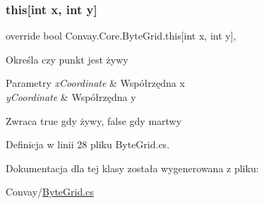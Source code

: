 \subsubsection{\texorpdfstring{this[int x, int y]}{this[int x, int y]}}
{\footnotesize\ttfamily override bool Convay.\+Core.\+Byte\+Grid.\+this\mbox{[}int x, int y\mbox{]}\hspace{0.3cm}{\ttfamily [get]}, {\ttfamily [set]}}



Określa czy punkt jest żywy 


\begin{DoxyParams}{Parametry}
{\em x\+Coordinate} & Współrzędna x\\
\hline
{\em y\+Coordinate} & Współrzędna y\\
\hline
\end{DoxyParams}
\begin{DoxyReturn}{Zwraca}
true gdy żywy, false gdy martwy
\end{DoxyReturn}


Definicja w linii 28 pliku Byte\+Grid.\+cs.



Dokumentacja dla tej klasy została wygenerowana z pliku\+:\begin{DoxyCompactItemize}
\item 
Convay/\hyperlink{_byte_grid_8cs}{Byte\+Grid.\+cs}\end{DoxyCompactItemize}
